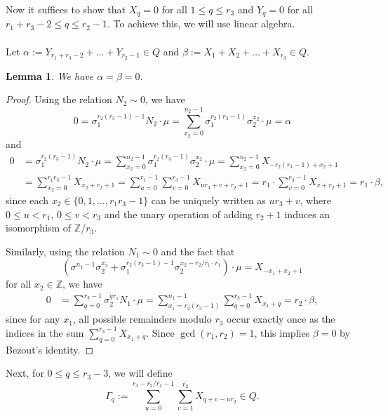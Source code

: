 \documentclass[12pt,a4paper]{article}
\newtheorem{lemma}[theorem]{Lemma}
\theoremstyle{definition}
\newcommand{\Z}{\mathbb{Z}}
\newcommand{\uo}{\overline{r_2}}
\newcommand{\vo}{\overline{r_1}}
\begin{document}


Now it suffices to show that $X_q=0$ for all $1\leq q\leq r_3$ and $Y_q=0$ for all $r_1+r_3-2\leq q\leq r_2-1$. To achieve this, we will use linear algebra.
\paragraph*{}
Let $\alpha:= Y_{r_1+r_3-2}+\dots+Y_{r_2-1}\in Q$ and $\beta:=X_1+X_2+\dots+X_{r_3}\in Q$.
\begin{lemma}
We have $\alpha=\beta=0$.
\end{lemma}
\begin{proof}
Using the relation $N_2\sim 0$, we have $$0=\sigma_1^{r_2(r_3-1)-1}N_2\cdot \mu =\sum_{x_2=0}^{n_2-1}  \sigma_1^{r_2(r_3-1)}\sigma_2^{x_2}\cdot \mu= \alpha$$ and
\begin{align*}
0&= \sigma_1^{r_2(r_3-1)}N_2\cdot \mu=\sum_{x_2=0}^{n_2-1}  \sigma_1^{r_2(r_3-1)}\sigma_2^{x_2}\cdot \mu=\sum_{x_2=0}^{n_2-1}  X_{-r_2(r_3-1)+x_2+1}\\
&=\sum_{x_2=0}^{r_1r_3-1}  X_{x_2+r_2+1}=
\sum_{u=0}^{r_1-1}\sum_{v=0}^{r_3-1} X_{ur_3+v+r_2+1}=r_1\cdot \sum_{v=0}^{r_3-1} X_{v+r_2+1}=r_1\cdot \beta,
\end{align*}
since each $x_2\in\{0,1,\dots,r_1r_3-1\}$ can be uniquely written as $ur_3+v$, where $0\leq u<r_1$, $0\leq v<r_3$ and the unary operation of adding $r_2+1$ induces an isomorphism of $\Z/r_3$.

Similarly, using the relation $N_1\sim 0$ and the fact that $$(\sigma^{n_1-1}\sigma_2^{x_2}+\sigma_1^{r_2(r_3-1)-1}\sigma_2^{x_2-\uo/\vo\cdot r_1})\cdot \mu=X_{\overline{-x_1+x_2}+1}$$ for all $x_2\in\Z$, we have 
\begin{align*}
0&= \sum_{q=0}^{r_3-1} \sigma_2^{qr_1}N_1\cdot \mu
   = \sum_{x_1=r_2(r_3-1)}^{n_1-1}\sum_{q=0}^{r_3-1}X_{x_1+q}
=r_2\cdot \beta,
\end{align*}
since for any $x_1$, all possible remainders modulo $r_3$ occur exactly once as the indices in the sum $\sum_{q=0}^{r_3-1}X_{x_1+q}$.
Since $\gcd(r_1,r_2)=1$, this implies $\beta=0$ by Bezout's identity.
\end{proof}

Next, for $0\leq q \leq r_3-3$, we will define $$\Gamma_q:=\sum_{u=0}^{r_3-\uo/\vo-1}\sum_{v=1}^{\uo}X_{\overline{q+v-ur_2}}\in Q.$$
\end{document}
